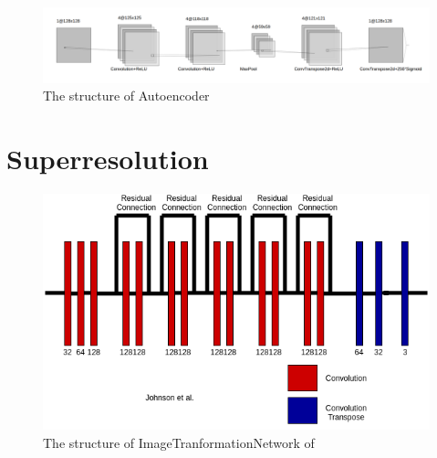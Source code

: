 \documentclass[a4paper,12pt,twoside]{report}
\begin{document}
\begin{figure}
  \centering
  \includegraphics[width=\textwidth]{autoencoder.png}
  \caption{The structure of Autoencoder}
\end{figure}

\section{Superresolution}
\begin{figure}
	\centering
	\includegraphics[scale=0.5]{ITN.png}
	\caption{The structure of ImageTranformationNetwork of \cite{johnson2016perceptual}}
\end{figure}
\end{document}
